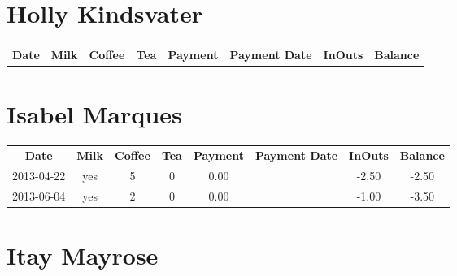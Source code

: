 \section{Holly Kindsvater}

\begin{center}
\begin{tabular}{cccccccc}
\textbf{Date} & \textbf{Milk} & \textbf{Coffee} & \textbf{Tea} & \textbf{Payment} & \textbf{Payment Date} & \textbf{InOuts} & \textbf{Balance} \\

\end{tabular}
\end{center}

\section{Isabel Marques}

\begin{center}
\begin{tabular}{cccccccc}
\textbf{Date} & \textbf{Milk} & \textbf{Coffee} & \textbf{Tea} & \textbf{Payment} & \textbf{Payment Date} & \textbf{InOuts} & \textbf{Balance} \\
2013-04-22 & yes & 5 & 0 & 0.00 &  & -2.50 & -2.50\\ 
2013-06-04 & yes & 2 & 0 & 0.00 &  & -1.00 & -3.50
\end{tabular}
\end{center}

\section{Itay Mayrose}


